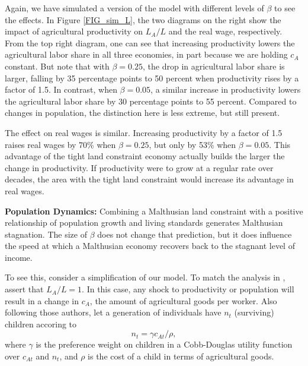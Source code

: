 \documentclass[11pt]{article}
\begin{document}
Again, we have simulated a version of the model with different levels of $\beta$ to see the effects. In Figure \ref{FIG_sim_L}, the two diagrams on the right show the impact of agricultural productivity on $L_A/L$ and the real wage, respectively. From the top right diagram, one can see that increasing productivity lowers the agricultural labor share in all three economies, in part because we are holding $c_A$ constant. But note that with $\beta=0.25$, the drop in agricultural labor share is larger, falling by 35 percentage points to 50 percent when productivity rises by a factor of 1.5. In contrast, when $\beta=0.05$, a similar increase in productivity lowers the agricultural labor share by 30 percentage points to 55 percent. Compared to changes in population, the distinction here is less extreme, but still present.

The effect on real wages is similar. Increasing productivity by a factor of 1.5 raises real wages by 70\% when $\beta=0.25$, but only by 53\% when $\beta=0.05$. This advantage of the tight land constraint economy actually builds the larger the change in productivity. If productivity were to grow at a regular rate over decades, the area with the tight land constraint would increase its advantage in real wages.

\vspace{.5cm}\noindent\textbf{Population Dynamics:} Combining a Malthusian land constraint with a positive relationship of population growth and living standards generates Malthusian stagnation. The size of $\beta$ does not change that prediction, but it does influence the speed at which a Malthusian economy recovers back to the stagnant level of income. 

To see this, consider a simplification of our model. To match the analysis in \citet{ashraf2010dynamics}, assert that $L_A/L = 1$. In this case, any shock to productivity or population will result in a change in $c_A$, the amount of agricultural goods per worker. Also following those authors, let a generation of individuals have $n_t$ (surviving) children accoring to
\begin{equation}
    n_t = \gamma c_{At} /\rho,
\end{equation}
where $\gamma$ is the preference weight on children in a Cobb-Douglas utility function over $c_{At}$ and $n_t$, and $\rho$ is the cost of a child in terms of agricultural goods.
\end{document}
